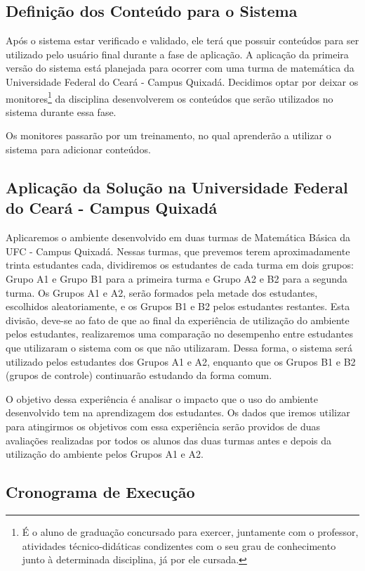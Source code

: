 \subsection{Definição dos Conteúdo para o Sistema}

Após o sistema estar verificado e validado, ele terá que possuir conteúdos para ser utilizado pelo usuário final durante a fase de aplicação. A aplicação da primeira versão do sistema está planejada 
para ocorrer com uma turma de matemática da Universidade Federal do Ceará - Campus Quixadá. Decidimos optar por deixar os monitores\footnote{É o aluno de graduação concursado para exercer, juntamente 
com o professor, atividades técnico-didáticas condizentes com o seu grau de conhecimento junto à determinada disciplina, já por ele cursada.} da disciplina desenvolverem os conteúdos que ser\~ao 
utilizados no sistema durante essa fase. 

Os monitores passar\~ao por um treinamento, no qual aprender\~ao a utilizar o sistema para adicionar conteúdos.

\subsection{Aplicação da Solução na Universidade Federal do Ceará - Campus Quixadá}

Aplicaremos o ambiente desenvolvido em duas turmas de Matemática Básica da UFC - Campus Quixadá. Nessas turmas, que prevemos terem aproximadamente trinta estudantes cada, dividiremos os estudantes de 
cada turma em dois grupos: Grupo A1 e Grupo B1 para a primeira turma e Grupo A2 e B2 para a segunda turma. Os Grupos A1 e A2, ser\~ao formados pela metade 
dos estudantes, escolhidos aleatoriamente, e os Grupos B1 e B2 pelos estudantes restantes. 
Esta divisão, deve-se ao fato de que ao final da experiência de utilização do ambiente pelos estudantes, realizaremos uma comparação no desempenho entre estudantes que utilizaram o sistema com os que 
não utilizaram. Dessa forma, o sistema será utilizado pelos estudantes dos Grupos A1 e A2, enquanto que os Grupos B1 e B2 (grupos de controle) continuar\~ao estudando da forma comum. 

O objetivo dessa experiência \'e analisar o impacto que o uso do ambiente desenvolvido tem na aprendizagem dos estudantes. Os dados que iremos utilizar para atingirmos os objetivos com essa 
experiência ser\~ao providos de duas avalia\c{c}\~oes realizadas por todos os alunos das duas turmas antes e depois da utiliza\c{c}\~ao do ambiente pelos Grupos A1 e A2.

\subsection{Cronograma de Execução}

